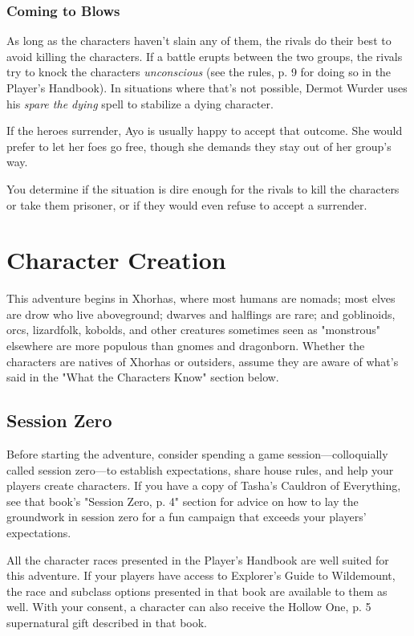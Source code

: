 \documentclass[letterpaper, 11pt, bg=full, twocolumn]{dndbook}
\begin{document}
\subsubsection{Coming to Blows}

As long as the characters haven't slain any of them, the rivals do their best to avoid killing the characters. If a battle erupts between the two groups, the rivals try to knock the characters \textit{unconscious} (see the rules, p. 9 for doing so in the Player's Handbook). In situations where that's not possible, Dermot Wurder uses his \textit{spare the dying} spell to stabilize a dying character.

If the heroes surrender, Ayo is usually happy to accept that outcome. She would prefer to let her foes go free, though she demands they stay out of her group's way.

You determine if the situation is dire enough for the rivals to kill the characters or take them prisoner, or if they would even refuse to accept a surrender.

\section{Character Creation}

This adventure begins in Xhorhas, where most humans are nomads; most elves are drow who live aboveground; dwarves and halflings are rare; and goblinoids, orcs, lizardfolk, kobolds, and other creatures sometimes seen as "monstrous" elsewhere are more populous than gnomes and dragonborn. Whether the characters are natives of Xhorhas or outsiders, assume they are aware of what's said in the "What the Characters Know" section below.

\subsection{Session Zero}

Before starting the adventure, consider spending a game session---colloquially called session zero---to establish expectations, share house rules, and help your players create characters. If you have a copy of Tasha's Cauldron of Everything, see that book's "Session Zero, p. 4" section for advice on how to lay the groundwork in session zero for a fun campaign that exceeds your players' expectations.

All the character races presented in the Player's Handbook are well suited for this adventure. If your players have access to Explorer's Guide to Wildemount, the race and subclass options presented in that book are available to them as well. With your consent, a character can also receive the Hollow One, p. 5 supernatural gift described in that book.
\end{document}
